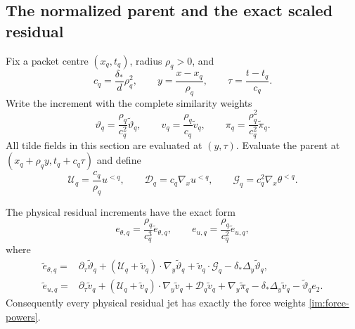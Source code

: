 \subsection{The normalized parent and the exact scaled residual}

Fix a packet centre $(x_q,t_q)$, radius $\rho_q>0$, and
\begin{equation}\label{ibc:clock}
 c_q=\frac{\delta_*}{d}\rho_q^2,\qquad
 y=\frac{x-x_q}{\rho_q},\qquad
 \tau=\frac{t-t_q}{c_q}.
\end{equation}
Write the increment with the complete similarity weights
\begin{equation}\label{ibc:increment-map}
 \vartheta_q=\frac{\rho_q}{c_q^2}\widetilde\vartheta_q,\qquad
 v_q=\frac{\rho_q}{c_q}\widetilde v_q,\qquad
 \pi_q=\frac{\rho_q^2}{c_q^2}\widetilde\pi_q.
\end{equation}
All tilde fields in this section are evaluated at $(y,\tau)$.  Evaluate the
parent at $(x_q+\rho_qy,t_q+c_q\tau)$ and define
\begin{equation}\label{ibc:parent-map}
 \mathcal U_q=\frac{c_q}{\rho_q}u^{<q},\qquad
 \mathcal D_q=c_q\nabla_xu^{<q},\qquad
 \mathcal G_q=c_q^2\nabla_x\theta^{<q}.
\end{equation}

\begin{proposition}\label{ibc:normalized-residual}
The physical residual increments have the exact form
\begin{equation}\label{ibc:residual-scaling}
 e_{\theta,q}=\frac{\rho_q}{c_q^3}\widetilde e_{\theta,q},
 \qquad
 e_{u,q}=\frac{\rho_q}{c_q^2}\widetilde e_{u,q},
\end{equation}
where
\begin{align}
 \widetilde e_{\theta,q}={}&
 \partial_\tau\widetilde\vartheta_q
 +(\mathcal U_q+\widetilde v_q)\cdot
       \nabla_y\widetilde\vartheta_q
 +\widetilde v_q\cdot\mathcal G_q
 -\delta_*\Delta_y\widetilde\vartheta_q,
 \label{ibc:normalized-scalar}\\
 \widetilde e_{u,q}={}&
 \partial_\tau\widetilde v_q
 +(\mathcal U_q+\widetilde v_q)\cdot\nabla_y\widetilde v_q
 +\mathcal D_q\widetilde v_q+\nabla_y\widetilde\pi_q
 -\delta_*\Delta_y\widetilde v_q
 -\widetilde\vartheta_qe_2.
 \label{ibc:normalized-vector}
\end{align}
Consequently every physical residual jet has exactly the force weights
\eqref{im:force-powers}.
\end{proposition}

